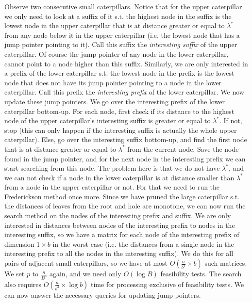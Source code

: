 \documentclass[11pt,a4paper]{article}
\theoremstyle{definition}
\theoremstyle{remark}
\begin{document}
Observe two consecutive small caterpillars. Notice that for the upper caterpillar we only need to look at a suffix of it s.t. the highest node in the suffix is the lowest node in the upper caterpillar that is at distance greater or equal to $\lambda ^*$ from any node below it in the upper caterpillar (i.e. the lowest node that has a jump pointer pointing to it). Call this suffix the \emph{interesting suffix} of the upper caterpillar. Of course the jump pointer of any node in the lower caterpillar, cannot point to a node higher than this suffix. Similarly, we are only interested in a prefix of the lower caterpillar s.t. the lowest node in the prefix is the lowest node that does not have its jump pointer pointing to a node in the lower caterpillar. Call this prefix the \emph{interesting prefix} of the lower caterpillar. We now update these jump pointers. We go over the interesting prefix of the lower caterpillar bottom-up. For each node, first check if its distance to the highest node of the upper caterpillar's interesting suffix is greater or equal to $\lambda ^*$. If not, stop (this can only happen if the interesting suffix is actually the whole upper caterpillar). Else, go over the interesting suffix bottom-up, and find the first node that is at distance greater or equal to $\lambda ^*$ from the current node. Save the node found in the jump pointer, and for the next node in the interesting prefix we can start searching from this node. The problem here is that we do not have $\lambda^*$, and we can not check if a node in the lower caterpillar is at distance smaller than $\lambda^*$ from a node in the upper caterpillar or not. For that we need to run the Frederickson method once more. Since we have pruned the large caterpillar s.t. the distances of leaves from the root and hole are monotone, we can now run the search method on the nodes of the interesting prefix and suffix. We are only interested in distances between nodes of the interesting prefix to nodes in the interesting suffix, so we have a matrix for each node of the interesting prefix of dimension $1 \times b$ in the worst case (i.e. the distances from a single node in the interesting prefix  to all the nodes in the interesting suffix). We do this for all pairs of adjacent small caterpillars, so we have at most $O(\frac{n}{b^4} \times b)$ such matrices. We set $p$ to $\frac{n}{B^5}$ again, and we need only $O(\log B)$ feasibility tests. The search also requires $O(\frac{n}{b^3} \times \log b)$ time for processing exclusive of feasibility tests. We can now answer the necessary queries for updating jump pointers.
\end{document}

